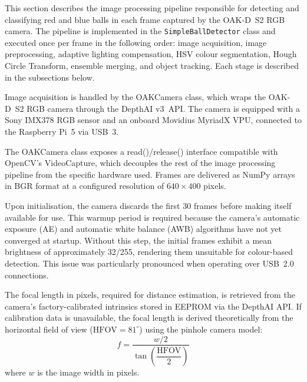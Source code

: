 \label{sec:image-processing}

This section describes the image processing pipeline responsible for detecting
and classifying red and blue balls in each frame captured by the OAK-D~S2 RGB
camera. The pipeline is implemented in the \texttt{SimpleBallDetector} class
and executed once per frame in the following order: image acquisition, image preprocessing, adaptive
lighting compensation, HSV colour segmentation, Hough
Circle Transform, ensemble merging, and object tracking. Each stage is
described in the subsections below.

\label{sec:acquisition}

Image acquisition is handled by the OAKCamera class, which wraps the
OAK-D~S2 RGB camera through the DepthAI v3~API\@. The camera is equipped
with a Sony IMX378 RGB sensor and an onboard Movidius MyriadX VPU, connected to
the Raspberry Pi~5 via USB~3.

The OAKCamera class exposes a read()/release() interface compatible with OpenCV's
VideoCapture, which decouples the rest of the image processing pipeline from the
specific hardware used. Frames are delivered as NumPy arrays in BGR format at a
configured resolution of $640 \times 400$ pixels.

Upon initialisation, the camera discards the first 30 frames before making itself
available for use. This warmup period is required because the camera's automatic
exposure (AE) and automatic white balance (AWB) algorithms have not yet converged
at startup. Without this step, the initial frames exhibit a mean brightness of
approximately 32/255, rendering them unsuitable for colour-based detection. This
issue was particularly pronounced when operating over USB~2.0 connections.

The focal length in pixels, required for distance estimation, is retrieved from the
camera's factory-calibrated intrinsics stored in EEPROM via the DepthAI API\@. If
calibration data is unavailable, the focal length is derived theoretically from the
horizontal field of view ($\mathrm{HFOV} = 81^{\circ}$) using the pinhole camera
model:
\begin{equation}
    f = \frac{w/2}{\tan\!\left(\dfrac{\mathrm{HFOV}}{2}\right)}
\end{equation}
where $w$ is the image width in pixels.

\label{sec:adaptive-lighting}

